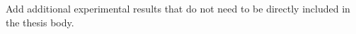 
\begin{appendix}

Add additional experimental results that do not need to be directly included in the thesis body. 

\end{appendix}

\endinput
